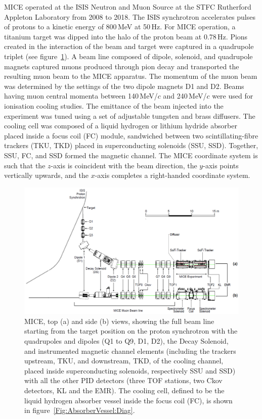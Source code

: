 MICE operated at the ISIS Neutron and Muon Source at the STFC
Rutherford Appleton Laboratory from 2008 to 2018.  
The ISIS synchrotron accelerates pulses of protons to a kinetic energy of 800\,MeV at 50\,Hz.
For MICE operation, a titanium target was dipped
into the halo of the proton beam at 0.78\,Hz. 
Pions created in the interaction of the beam and target were captured in a quadrupole triplet
(see figure~\ref{fig:BL}).
A beam line composed of dipole, solenoid, and quadrupole
magnets captured muons produced through pion decay and transported the
resulting muon beam to the MICE apparatus.
The momentum of the muon beam was determined by the settings of the two dipole magnets D1 and D2.
Beams having muon central momenta between 140\,MeV/$c$ and 240\,MeV/$c$ were used for ionisation cooling studies.
The emittance of the beam injected into the experiment was tuned using
a set of adjustable tungsten and brass diffusers.
The cooling cell was composed of a liquid hydrogen or lithium hydride
absorber placed inside a focus coil (FC) module, sandwiched between
two scintillating-fibre trackers (TKU, TKD) placed in superconducting
solenoids (SSU, SSD).
Together, SSU, FC, and SSD formed the magnetic channel.
The MICE coordinate system is such that the $z$-axis is coincident
with the beam direction, the $y$-axis points vertically upwards, and the
$x$-axis completes a right-handed coordinate system.

\begin{figure}[htb!]
  \begin{center}
    \includegraphics[width=1.0\columnwidth]{BL.png}
    \caption{
      MICE, top (a) and side (b) views, showing the full beam line
      starting from the target position on the proton synchrotron with the quadrupoles and dipoles (Q1 to Q9, D1, D2), the
      Decay Solenoid, and instrumented magnetic channel elements
      (including the trackers upstream, TKU, and downstream, TKD, of the cooling
      channel, placed inside superconducting solenoids, respectively SSU and SSD) with all the
      other PID detectors (three TOF stations, two Ckov detectors, KL and
      the EMR).
      The cooling cell, defined to be the liquid hydrogen absorber
      vessel inside the focus coil (FC), is shown in figure~\ref{Fig:AbsorberVessel:Diag}.
    }
    \label{fig:BL}
  \end{center}
\end{figure}

